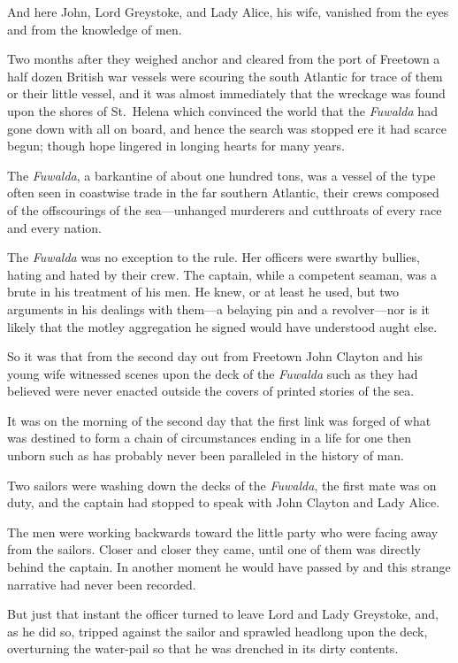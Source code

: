 And here John, Lord Greystoke, and Lady Alice, his wife, vanished from the eyes and from the knowledge of men.

Two months after they weighed anchor and cleared from the port of Freetown a half dozen British war vessels were scouring the south Atlantic for trace of them or their little vessel, and it was almost immediately that the wreckage was found upon the shores of St.~Helena which convinced the world that the \emph{Fuwalda} had gone down with all on board, and hence the search was stopped ere it had scarce begun; though hope lingered in longing hearts for many years.

The \emph{Fuwalda}, a barkantine of about one hundred tons, was a vessel of the type often seen in coastwise trade in the far southern Atlantic, their crews composed of the offscourings of the sea—unhanged murderers and cutthroats of every race and every nation.

The \emph{Fuwalda} was no exception to the rule. Her officers were swarthy bullies, hating and hated by their crew. The captain, while a competent seaman, was a brute in his treatment of his men. He knew, or at least he used, but two arguments in his dealings with them—a belaying pin and a revolver—nor is it likely that the motley aggregation he signed would have understood aught else.

So it was that from the second day out from Freetown John Clayton and his young wife witnessed scenes upon the deck of the \emph{Fuwalda} such as they had believed were never enacted outside the covers of printed stories of the sea.

It was on the morning of the second day that the first link was forged of what was destined to form a chain of circumstances ending in a life for one then unborn such as has probably never been paralleled in the history of man.

Two sailors were washing down the decks of the \emph{Fuwalda}, the first mate was on duty, and the captain had stopped to speak with John Clayton and Lady Alice.

The men were working backwards toward the little party who were facing away from the sailors. Closer and closer they came, until one of them was directly behind the captain. In another moment he would have passed by and this strange narrative had never been recorded.

But just that instant the officer turned to leave Lord and Lady Greystoke, and, as he did so, tripped against the sailor and sprawled headlong upon the deck, overturning the water-pail so that he was drenched in its dirty contents.

